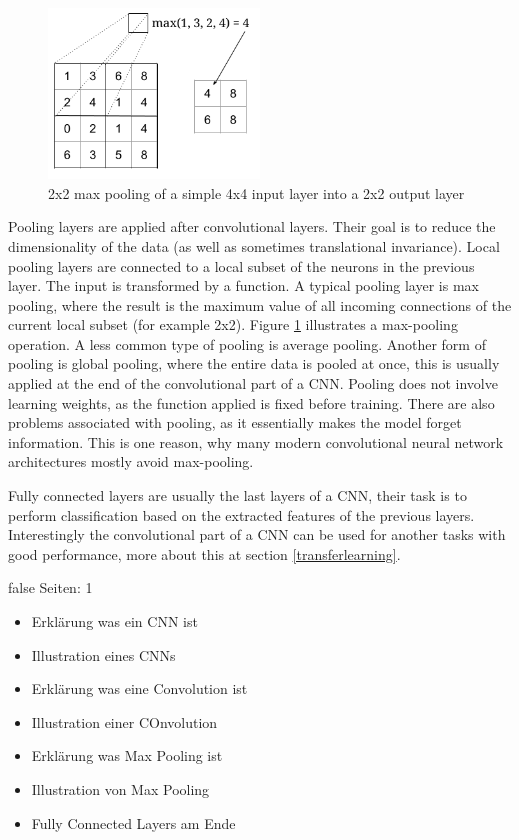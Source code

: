\documentclass[draft,final,oneside]{vutinfth} %
\begin{document}
\begin{figure}[ht]
	\centering
  	\includegraphics[width=0.5\textwidth]{graphics/maxpooling.png}
	\caption{2x2 max pooling of a simple 4x4 input layer into a 2x2 output layer}
	\label{fig:maxpooling}
\end{figure}

Pooling layers are applied after convolutional layers. Their goal is to reduce the dimensionality of the data (as well as sometimes translational invariance). Local pooling layers are connected to a local subset of the neurons in the previous layer. The input is transformed by a function. A typical pooling layer is max pooling, where the result is the maximum value of all incoming connections of the current local subset (for example 2x2). Figure \ref{fig:maxpooling} illustrates a max-pooling operation. A less common type of pooling is average pooling. Another form of pooling is global pooling, where the entire data is pooled at once, this is usually applied at the end of the convolutional part of a CNN. Pooling does not involve learning weights, as the function applied is fixed before training. There are also problems associated with pooling, as it essentially makes the model forget information. This is one reason, why many modern convolutional neural network architectures mostly avoid max-pooling. \cite{resnet}

Fully connected layers are usually the last layers of a CNN, their task is to perform classification based on the extracted features of the previous layers. Interestingly the convolutional part of a CNN can be used for another tasks with good performance, more about this at section \ref{transferlearning}.

\if false
Seiten: 1
\begin{itemize}

\item Erklärung was ein CNN ist
\item Illustration eines CNNs
\item Erklärung was eine Convolution ist
\item Illustration einer COnvolution
\item Erklärung was Max Pooling ist
\item Illustration von Max Pooling
\item Fully Connected Layers am Ende


\end{itemize}
\fi
\end{document}
